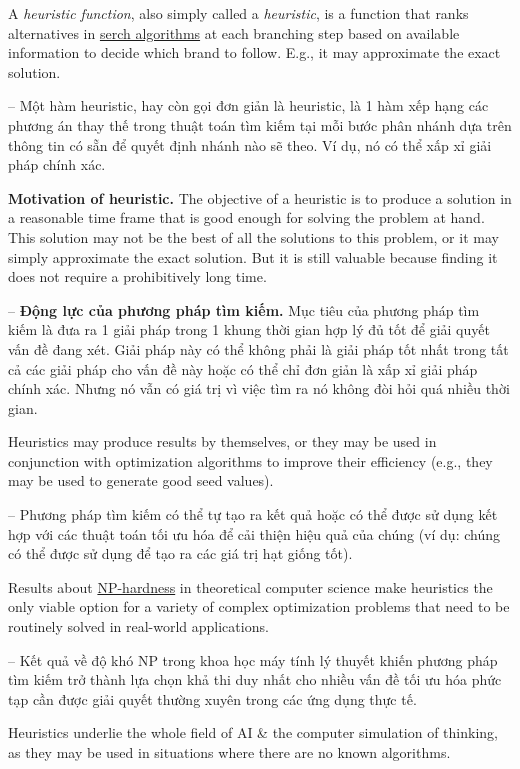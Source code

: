 \documentclass{article}
\begin{document}
A {\it heuristic function}, also simply called a {\it heuristic}, is a function that ranks alternatives in \href{https://en.wikipedia.org/wiki/Search_algorithm}{serch algorithms} at each branching step based on available information to decide which brand to follow. E.g., it may approximate the exact solution.

-- Một hàm heuristic, hay còn gọi đơn giản là heuristic, là 1 hàm xếp hạng các phương án thay thế trong thuật toán tìm kiếm tại mỗi bước phân nhánh dựa trên thông tin có sẵn để quyết định nhánh nào sẽ theo. Ví dụ, nó có thể xấp xỉ giải pháp chính xác.

{\bf Motivation of heuristic.} The objective of a heuristic is to produce a solution in a reasonable time frame that is good enough for solving the problem at hand. This solution may not be the best of all the solutions to this problem, or it may simply approximate the exact solution. But it is still valuable because finding it does not require a prohibitively long time.

-- {\bf Động lực của phương pháp tìm kiếm.} Mục tiêu của phương pháp tìm kiếm là đưa ra 1 giải pháp trong 1 khung thời gian hợp lý đủ tốt để giải quyết vấn đề đang xét. Giải pháp này có thể không phải là giải pháp tốt nhất trong tất cả các giải pháp cho vấn đề này hoặc có thể chỉ đơn giản là xấp xỉ giải pháp chính xác. Nhưng nó vẫn có giá trị vì việc tìm ra nó không đòi hỏi quá nhiều thời gian.

Heuristics may produce results by themselves, or they may be used in conjunction with optimization algorithms to improve their efficiency (e.g., they may be used to generate good seed values).

-- Phương pháp tìm kiếm có thể tự tạo ra kết quả hoặc có thể được sử dụng kết hợp với các thuật toán tối ưu hóa để cải thiện hiệu quả của chúng (ví dụ: chúng có thể được sử dụng để tạo ra các giá trị hạt giống tốt).

Results about \href{https://en.wikipedia.org/wiki/NP-hard}{NP-hardness} in theoretical computer science make heuristics the only viable option for a variety of complex optimization problems that need to be routinely solved in real-world applications.

-- Kết quả về độ khó NP trong khoa học máy tính lý thuyết khiến phương pháp tìm kiếm trở thành lựa chọn khả thi duy nhất cho nhiều vấn đề tối ưu hóa phức tạp cần được giải quyết thường xuyên trong các ứng dụng thực tế.

Heuristics underlie the whole field of AI \& the computer simulation of thinking, as they may be used in situations where there are no known algorithms.
\end{document}
